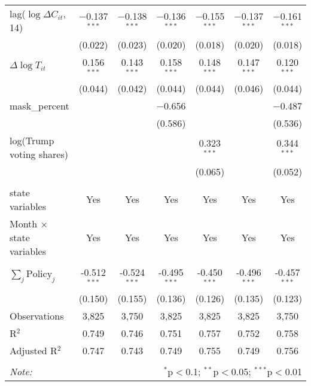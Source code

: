 \begin{tabular}{@{\extracolsep{1pt}}lcccccc}
  lag($\log \Delta C_{it}$, 14) & $-$0.137$^{***}$ & $-$0.138$^{***}$ & $-$0.136$^{***}$ & $-$0.155$^{***}$ & $-$0.137$^{***}$ & $-$0.161$^{***}$ \\ 
  & (0.022) & (0.023) & (0.020) & (0.018) & (0.020) & (0.018) \\ 
  $\Delta \log T_{it}$ & 0.156$^{***}$ & 0.143$^{***}$ & 0.158$^{***}$ & 0.148$^{***}$ & 0.147$^{***}$ & 0.120$^{***}$ \\ 
  & (0.044) & (0.042) & (0.044) & (0.044) & (0.046) & (0.044) \\ 
  mask\_percent &  &  & $-$0.656 &  &  & $-$0.487 \\ 
  &  &  & (0.586) &  &  & (0.536) \\ 
  log(Trump voting shares) &  &  &  & 0.323$^{***}$ &  & 0.344$^{***}$ \\ 
  &  &  &  & (0.065) &  & (0.052) \\ 
 \hline \\[-1.8ex] 
state variables & Yes & Yes & Yes & Yes & Yes & Yes \\ 
Month $\times$ state variables & Yes & Yes & Yes & Yes & Yes & Yes \\ 
\hline \\[-1.8ex] 
$\sum_j \mathrm{Policy}_j$ & -0.512$^{***}$ & -0.524$^{***}$ & -0.495$^{***}$ & -0.450$^{***}$ & -0.496$^{***}$ & -0.457$^{***}$ \\ 
 & (0.150) & (0.155) & (0.136) & (0.126) & (0.135) & (0.123) \\ 
Observations & 3,825 & 3,750 & 3,825 & 3,825 & 3,825 & 3,750 \\ 
R$^{2}$ & 0.749 & 0.746 & 0.751 & 0.757 & 0.752 & 0.758 \\ 
Adjusted R$^{2}$ & 0.747 & 0.743 & 0.749 & 0.755 & 0.749 & 0.756 \\ 
\hline 
\hline \\[-1.8ex] 
\textit{Note:}  & \multicolumn{6}{r}{$^{*}$p$<$0.1; $^{**}$p$<$0.05; $^{***}$p$<$0.01} \\ 
\end{tabular} 